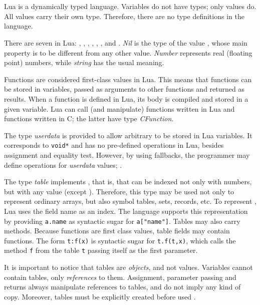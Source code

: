 \section{} \label{TypesSec}

Lua is a dynamically typed language.
Variables do not have types; only values do.
All values carry their own type.
Therefore, there are no type definitions in the language.

There are seven  in Lua: , ,
, , , ,
and .
{\em Nil\/} is the type of the value \nil,
whose main property is to be different from any other value.
{\em Number\/} represents real (floating point) numbers,
while {\em string\/} has the usual meaning.

Functions are considered first-class values in Lua.
This means that functions can be stored in variables,
passed as arguments to other functions and returned as results.
When a function is defined in Lua, its body is compiled and stored
in a given variable.
Lua can call (and manipulate) functions written in Lua and
functions written in C; the latter have type {\em CFunction}.

The type {\em userdata\/} is provided to allow
arbitrary  to be stored in Lua variables.
It corresponds to \verb'void*' and has no pre-defined operations in Lua,
besides assignment and equality test.
However, by using fallbacks, the programmer may define operations
for {\em userdata\/} values; .

The type {\em table\/} implements ,
that is,  that can be indexed not only with numbers,
but with any value (except \nil).
Therefore, this type may be used not only to represent ordinary arrays,
but also symbol tables, sets, records, etc.
To represent , Lua uses the field name as an index.
The language supports this representation by
providing \verb'a.name' as syntactic sugar for \verb'a["name"]'.
Tables may also carry methods.
Because functions are first class values,
table fields may contain functions.
The form \verb't:f(x)' is syntactic sugar for \verb't.f(t,x)',
which calls the method \verb'f' from the table \verb't' passing
itself as the first parameter.

It is important to notice that tables are {\em objects}, and not values.
Variables cannot contain tables, only {\em references\/} to them.
Assignment, parameter passing and returns always manipulate references
to tables, and do not imply any kind of copy.
Moreover, tables must be explicitly created before used
.



